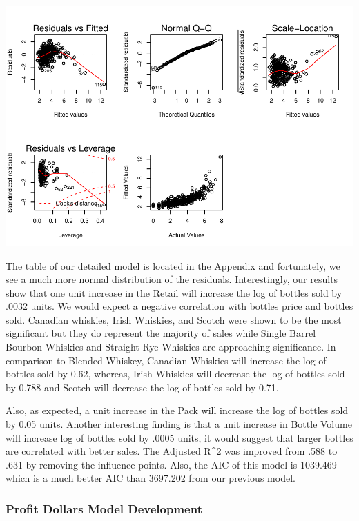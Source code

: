 \documentclass[]{elsarticle} %
\makeatletter
\def\maxwidth{\ifdim\Gin@nat@width>\linewidth\linewidth
\else\Gin@nat@width\fi}
\let\Oldincludegraphics\includegraphics
\renewcommand{\includegraphics}[1]{\Oldincludegraphics[width=\maxwidth]{#1}}
\makeatother
\begin{document}
\includegraphics{Final_Project_files/figure-latex/unnamed-chunk-16-1.pdf}

\bigskip

The table of our detailed model is located in the Appendix and
fortunately, we see a much more normal distribution of the residuals.
Interestingly, our results show that one unit increase in the Retail
will increase the log of bottles sold by .0032 units. We would expect a
negative correlation with bottles price and bottles sold. Canadian
whiskies, Irish Whiskies, and Scotch were shown to be the most
significant but they do represent the majority of sales while Single
Barrel Bourbon Whiskies and Straight Rye Whiskies are approaching
significance. In comparison to Blended Whiskey, Canadian Whiskies will
increase the log of bottles sold by 0.62, whereas, Irish Whiskies will
decrease the log of bottles sold by 0.788 and Scotch will decrease the
log of bottles sold by 0.71.

Also, as expected, a unit increase in the Pack will increase the log of
bottles sold by 0.05 units. Another interesting finding is that a unit
increase in Bottle Volume will increase log of bottles sold by .0005
units, it would suggest that larger bottles are correlated with better
sales. The Adjusted R\^{}2 was improved from .588 to .631 by removing
the influence points. Also, the AIC of this model is 1039.469 which is a
much better AIC than 3697.202 from our previous model.

\newpage

\subsubsection{Profit Dollars Model
Development}\label{profit-dollars-model-development}
\end{document}
